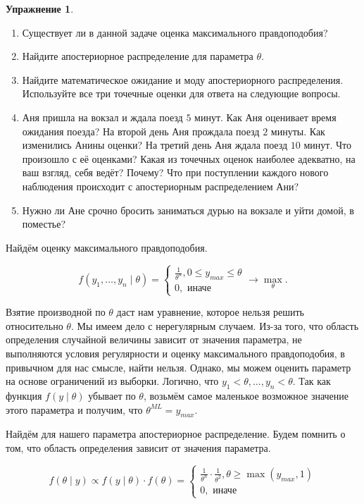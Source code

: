 \documentclass[12pt, a4paper, oneside]{extreport}
\theoremstyle{plain}              %
\theoremstyle{definition}         %
\newtheorem{problem}{\color{myblue} Упражнение}
\begin{document}
\begin{problem}
\begin{enumerate}
\item Существует ли в данной задаче оценка максимального правдоподобия?
\item Найдите апостериорное распределение для параметра $\theta$.
\item Найдите математическое ожидание и моду апостериорного распределения. Используйте все три точечные оценки для ответа на следующие вопросы.
\item Аня пришла на вокзал и ждала поезд $5$ минут. Как Аня оценивает время ожидания поезда? На второй  день Аня прождала поезд $2$ минуты. Как изменились Анины оценки?  На третий день Аня ждала поезд $10$ минут. Что произошло с её оценками? Какая из точечных оценок наиболее адекватно, на ваш взгляд, себя ведёт? Почему? Что при поступлении каждого нового наблюдения происходит с апостериорным распределением Ани?  
\item Нужно ли Ане срочно бросить заниматься дурью на вокзале и уйти домой, в поместье?
\end{enumerate} 
\begin{sol}
Найдём оценку максимального правдоподобия. 

\[f(y_1, \ldots, y_n \mid \theta) = \begin{cases}  \frac{1}{\theta^n}, 0 \le y_{max} \le \theta \\ 0, \text{ иначе} \end{cases}  \to \max_{\theta}.\]

Взятие производной по $\theta$ даст нам уравнение, которое нельзя решить относительно $\theta$. Мы имеем дело с нерегулярным случаем. Из-за того, что область определения случайной величины зависит от значения параметра, не выполняются условия регулярности и оценку максимального правдоподобия, в привычном для нас смысле, найти нельзя. Однако, мы можем оценить параметр на основе ограничений из выборки. Логично, что $y_1 < \theta, \ldots, y_n < \theta$. Так как функция $f(y \mid \theta)$ убывает по $\theta$, возьмём самое маленькое возможное значение этого параметра и получим, что $\theta^{ML} = y_{max}$.

Найдём для нашего параметра апостериорное распределение. Будем помнить о том, что область определения зависит от значения параметра.

\[ f(\theta \mid y) \propto f(y \mid \theta) \cdot f(\theta) = \begin{cases} \frac{1}{\theta^n} \cdot \frac{1}{\theta^2}, \theta \ge \max(y_{max},1) \\ 0, \text{ иначе} \end{cases}\]


\end{sol}
\end{problem}
\end{document}
